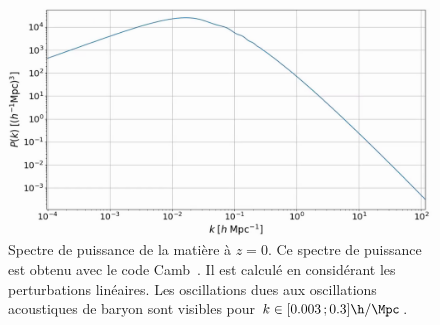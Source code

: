\documentclass[11pt, twoside, a4paper, openright]{report}
\begin{document}
\begin{figure}
  \centering
  \includegraphics[scale=0.37]{pk_camb}
  \caption{Spectre de puissance de la matière à $z = 0$. Ce spectre de puissance est obtenu avec le code Camb~\autocite{Lewis1999}. Il est calculé en considérant les perturbations linéaires. Les oscillations dues aux oscillations acoustiques de baryon sont visibles pour $k \in [\num{0.003} \,; \num{0.3}] \si{\h\per\Mpc}$.}
  \label{fig:pk_camb}
\end{figure}
\end{document}
